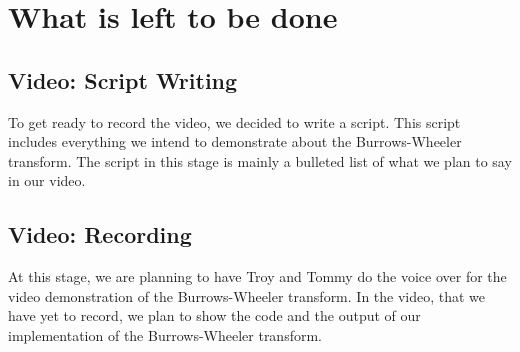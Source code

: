 \documentclass{article}
\begin{document}
   \section{What is left to be done}
   
   \subsection{Video: Script Writing}
   To get ready to record the video, we decided to write a script. This script includes everything we intend to demonstrate about the Burrows-Wheeler transform. The script in this stage is mainly a bulleted list of what we plan to say in our video.
   
   \subsection{Video: Recording}
   At this stage, we are planning to have Troy and Tommy do the voice over for the video demonstration of the Burrows-Wheeler transform. In the video, that we have yet to record, we plan to show the code and the output of our implementation of the Burrows-Wheeler transform.
\end{document}
